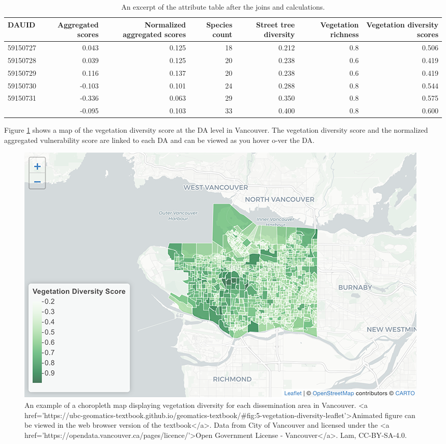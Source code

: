 \documentclass[
]{book}
\begin{document}
\begin{table}

\caption{\label{tab:5-case-study-6}An excerpt of the attribute table after the joins and calculations.}
\centering
\begin{tabular}[t]{lrrrrrr}
\toprule
DAUID & Aggregated scores & Normalized aggregated scores & Species count & Street tree diversity & Vegetation richness & Vegetation diversity scores\\
\midrule
59150727 & 0.043 & 0.125 & 18 & 0.212 & 0.8 & 0.506\\
59150728 & 0.039 & 0.125 & 20 & 0.238 & 0.6 & 0.419\\
59150729 & 0.116 & 0.137 & 20 & 0.238 & 0.6 & 0.419\\
59150730 & -0.103 & 0.101 & 24 & 0.288 & 0.8 & 0.544\\
59150731 & -0.336 & 0.063 & 29 & 0.350 & 0.8 & 0.575\\
\addlinespace
59150732 & -0.095 & 0.103 & 33 & 0.400 & 0.8 & 0.600\\
\bottomrule
\end{tabular}
\end{table}

Figure \ref{fig:5-vegetation-diversity-leaflet} shows a map of the vegetation diversity score at the DA level in Vancouver. The vegetation diversity score and the normalized aggregated vulnerability score are linked to each DA and can be viewed as you hover o-ver the DA.

\begin{figure}
\includegraphics[width=1\linewidth]{images/05-vegetation-diversity-leaflet} \caption{An example of a choropleth map displaying vegetation diversity for each dissemination area in Vancouver. <a href='https://ubc-geomatics-textbook.github.io/geomatics-textbook/#fig:5-vegetation-diversity-leaflet'>Animated figure can be viewed in the web browser version of the textbook</a>. Data from City of Vancouver and licensed under the <a href='https://opendata.vancouver.ca/pages/licence/'>Open Government License - Vancouver</a>. Lam, CC-BY-SA-4.0.}\label{fig:5-vegetation-diversity-leaflet}
\end{figure}
\end{document}
